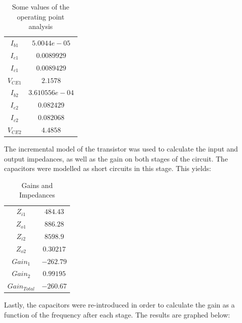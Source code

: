 \begin{table}[H]
    \addtolength{\tabcolsep}{-4pt}
    \caption{Some values of the operating point analysis}
    \vspace{-3mm}
    \begin{tabular}{|c|c|}
    \hline
    $I_{b1}$ &  $5.0044e-05$\\
    $I_{e1}$ &  $0.0089929$\\
    $I_{c1}$ &  $0.0089429$  \\ 
    $V_{CE1}$ & $ 2.1578$\\
    $I_{b2}$ &  $3.610556e-04$ \\
    $I_{e2}$ &  $0.082429$\\
    $I_{c2}$ &  $0.082068$\\
    $V_{CE2}$ & $4.4858$\\
    \hline
    \end{tabular}
    \label{tab:OP_mat}
\end{table}

The incremental model of the transistor was used to calculate the input and output impedances, as well as
the gain on both stages of the circuit. The capacitors were modelled as short circuits in this stage. This yields:

\begin{table}[H]
    \addtolength{\tabcolsep}{-4pt}
    \caption{Gains and Impedances}
    \vspace{-3mm}
    \begin{tabular}{|c|c|}
    \hline
    $Z_{i1}$ &  $484.43$\\
    $Z_{o1}$ &  $886.28$\\
    $Z_{i2}$ &  $8598.9$\\
    $Z_{o2}$ &  $0.30217$\\
    $Gain_1$ & $-262.79$\\
    $Gain_2$ &  $0.99195$\\
    $Gain_{Total}$ & $-260.67$\\
    \hline
    \end{tabular}
    \label{tab:Z_mat}
\end{table}

Lastly, the capacitors were re-introduced in order to calculate the gain as a function of the frequency after each stage.
The results are graphed below:

